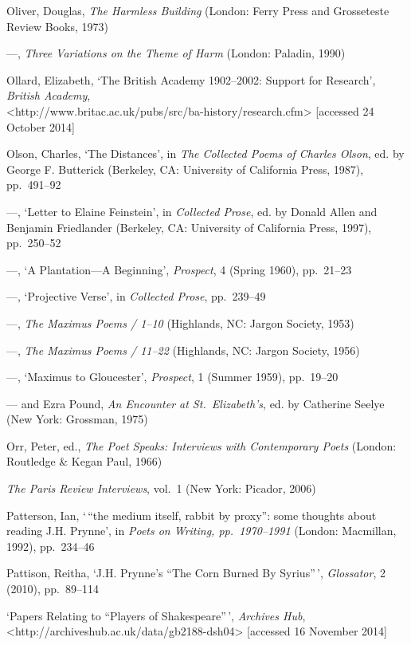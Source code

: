 \documentclass[]{article}
\begin{document}
Oliver, Douglas, \emph{The Harmless Building} (London: Ferry Press and
Grosseteste Review Books, 1973)

---, \emph{Three Variations on the Theme of Harm} (London: Paladin,
1990)

Ollard, Elizabeth, `The British Academy 1902--2002: Support for
Research', \emph{British Academy},\\
\textless{}http://www.britac.ac.uk/pubs/src/ba-history/research.cfm\textgreater{}
{[}accessed 24 October 2014{]}

Olson, Charles, `The Distances', in \emph{The Collected Poems of Charles
Olson}, ed. by George F. Butterick (Berkeley, CA: University of
California Press, 1987), pp.~491--92

---, `Letter to Elaine Feinstein', in \emph{Collected Prose}, ed. by
Donald Allen and Benjamin Friedlander (Berkeley, CA: University of
California Press, 1997), pp.~250--52

---, `A Plantation---A Beginning', \emph{Prospect}, 4 (Spring 1960),
pp.~21--23

---, `Projective Verse', in \emph{Collected Prose}, pp.~239--49

---, \emph{The Maximus Poems / 1--10} (Highlands, NC: Jargon Society,
1953)

---, \emph{The Maximus Poems / 11--22} (Highlands, NC: Jargon Society,
1956)

---, `Maximus to Gloucester', \emph{Prospect}, 1 (Summer 1959),
pp.~19--20

--- and Ezra Pound, \emph{An Encounter at St.~Elizabeth's}, ed. by
Catherine Seelye (New York: Grossman, 1975)

Orr, Peter, ed., \emph{The Poet Speaks: Interviews with Contemporary
Poets} (London: Routledge \& Kegan Paul, 1966)

\emph{The Paris Review Interviews}, vol.~1 (New York: Picador, 2006)

Patterson, Ian, `\,``the medium itself, rabbit by proxy'': some thoughts
about reading J.H. Prynne', in \emph{Poets on Writing, pp.~1970--1991}
(London: Macmillan, 1992), pp.~234--46

Pattison, Reitha, `J.H. Prynne's ``The Corn Burned By Syrius''\,',
\emph{Glossator}, 2 (2010), pp.~89--114

`Papers Relating to ``Players of Shakespeare''\,', \emph{Archives
Hub},\\
\textless{}http://archiveshub.ac.uk/data/gb2188-dsh04\textgreater{}
{[}accessed 16 November 2014{]}
\end{document}
